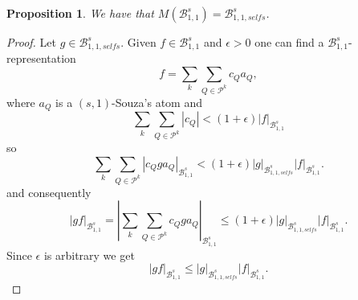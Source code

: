 \documentclass{amsart}
\newtheorem{proposition}[theorem]{Proposition}
\theoremstyle{definition}
\begin{document}
\begin{proposition} We have that $M(\mathcal{B}^s_{1,1})=\mathcal{B}^s_{1,1,selfs}$.
\end{proposition} 
\begin{proof} Let $g \in \mathcal{B}^s_{1,1,selfs}.$ Given $f\in  \mathcal{B}^s_{1,1}$ and  $\epsilon > 0$  one can find a $\mathcal{B}^s_{1,1}$-representation 
$$f=\sum_{k}\sum_{Q\in \mathcal{P}^k} c_Qa_Q,$$
where $a_Q$ is a $(s,1)$-Souza's atom and 
$$\sum_k \sum_{Q\in \mathcal{P}^k} |c_Q| < (1+\epsilon) |f|_{\mathcal{B}^s_{1,1}}$$
so 
$$\sum_k \sum_{Q\in \mathcal{P}^k} |c_Q ga_Q|_{\mathcal{B}^s_{1,1}} < (1+ \epsilon) |g|_{\mathcal{B}^s_{1,1,selfs}}|f|_{\mathcal{B}^s_{1,1}}.$$ 
and consequently 
$$|gf|_{\mathcal{B}^s_{1,1}}=|\sum_{k}\sum_{Q\in \mathcal{P}^k} c_Qga_Q|_{\mathcal{B}^s_{1,1}}\leq (1+ \epsilon)  |g|_{\mathcal{B}^s_{1,1,selfs}}|f|_{\mathcal{B}^s_{1,1}}.$$
Since $\epsilon$ is arbitrary we get
$$|gf|_{\mathcal{B}^s_{1,1}}\leq  |g|_{\mathcal{B}^s_{1,1,selfs}} |f|_{\mathcal{B}^s_{1,1}}.$$
\end{proof} 
\end{document}
